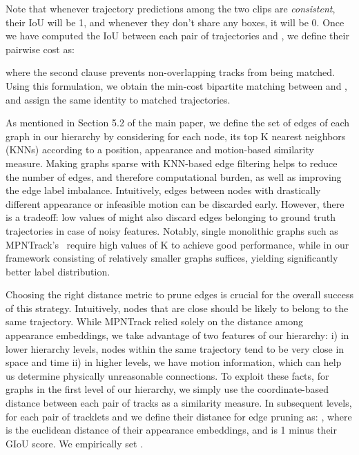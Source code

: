 \documentclass[10pt,twocolumn,letterpaper]{article}
\begin{document}
{{Note that whenever trajectory predictions among the two clips are \textit{consistent}, their IoU will be 1, and whenever they don't share any boxes, it will be 0. Once we have computed the IoU between each pair of trajectories   and , we define their pairwise cost as:

where the second clause prevents non-overlapping tracks from being matched. Using this formulation, we obtain the min-cost bipartite matching between  and , and assign the same identity to matched trajectories.

 As mentioned in Section 5.2 of the main paper, we define the set of edges of each graph in our hierarchy by considering for each node, its top K nearest neighbors (KNNs) according to a position, appearance and motion-based similarity measure. Making graphs sparse with KNN-based edge filtering helps to reduce the number of edges, and therefore computational burden, as well as improving the edge label imbalance. Intuitively, edges between nodes with drastically different appearance or infeasible motion can be discarded early. However, there is a tradeoff: low values of  might also discard edges belonging to ground truth trajectories in case of noisy features. Notably, single monolithic graphs such as MPNTrack's~\cite{mpntrack} require high values of K to achieve good performance, while in our framework consisting of relatively smaller graphs  suffices, yielding significantly better label distribution. 

Choosing the right distance metric to prune edges is crucial for the overall success of this strategy. Intuitively, nodes that are close should be likely to belong to the same trajectory. While MPNTrack relied solely on the distance among appearance embeddings, we take advantage of two features of our hierarchy: i) in lower hierarchy levels, nodes within the same trajectory tend to be very close in space and time ii) in higher levels, we have motion information, which can help us determine physically unreasonable connections. To exploit these facts, for graphs in the first level of our hierarchy, we simply use the coordinate-based distance between each pair of tracks as a similarity measure. In subsequent levels, for each pair of tracklets  and  we define their distance for edge pruning as: , where  is the euclidean distance of their appearance embeddings, and  is 1 minus their GIoU score. We empirically set .

}}
\end{document}
